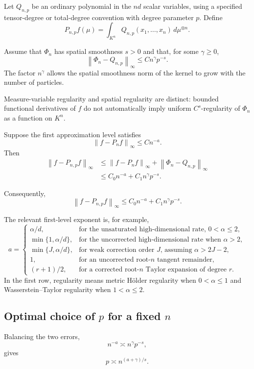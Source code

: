 \documentclass[11pt]{article}
\newcommand{\norm}[1]{\left\lVert #1\right\rVert}
\begin{document}
Let \(Q_{n,p}\) be an ordinary polynomial in the \(nd\) scalar
variables, using a specified tensor-degree or total-degree convention
with degree parameter \(p\). Define
\[
P_{n,p}f(\mu)
=
\int_{K^n}
Q_{n,p}(x_1,\ldots,x_n)\,d\mu^{\otimes n}.
\]

Assume that \(\Phi_n\) has spatial smoothness \(s>0\) and that, for
some \(\gamma\geq0\),
\[
\boxed{
\norm{\Phi_n-Q_{n,p}}_\infty
\leq
C n^\gamma p^{-s}.
}
\]
The factor \(n^\gamma\) allows the spatial smoothness norm of the kernel
to grow with the number of particles.

Measure-variable regularity and spatial regularity are distinct:
bounded functional derivatives of \(f\) do not automatically imply
uniform \(C^s\)-regularity of \(\Phi_n\) as a function on \(K^n\).

Suppose the first approximation level satisfies
\[
\norm{f-P_nf}_\infty\leq Cn^{-a}.
\]
Then
\[
\begin{aligned}
\norm{f-P_{n,p}f}_\infty
&\leq
\norm{f-P_nf}_\infty
+
\norm{\Phi_n-Q_{n,p}}_\infty\\
&\leq
C_0n^{-a}+C_1n^\gamma p^{-s}.
\end{aligned}
\]

Consequently,
\[
\boxed{
\norm{f-P_{n,p}f}_\infty
\leq
C_0n^{-a}+C_1n^\gamma p^{-s}.
}
\]

The relevant first-level exponent is, for example,
\[
a=
\begin{cases}
\alpha/d,
&
\text{for the unsaturated high-dimensional rate, }0<\alpha\leq2,\\[1mm]
\min\{1,\alpha/d\},
&
\text{for the uncorrected high-dimensional rate when \(\alpha>2\)},\\[1mm]
\min\{J,\alpha/d\},
&
\text{for weak correction order }J\text{, assuming }\alpha>2J-2,\\[1mm]
1,
&
\text{for an uncorrected root-\(n\) tangent remainder},\\[1mm]
(r+1)/2,
&
\text{for a corrected root-\(n\) Taylor expansion of degree \(r\)}.
\end{cases}
\]
In the first row, regularity means metric Hölder regularity when
\(0<\alpha\leq1\) and Wasserstein--Taylor regularity when
\(1<\alpha\leq2\).

\subsection{Optimal choice of \(p\) for a fixed \(n\)}

Balancing the two errors,
\[
n^{-a}\asymp n^\gamma p^{-s},
\]
gives
\[
\boxed{
p\asymp n^{(a+\gamma)/s}.
}
\]
\end{document}
